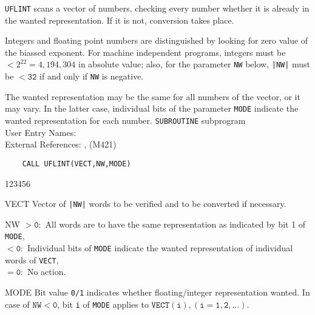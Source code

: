                      
                      
\Submitter{}                          
                    
\begin{center}
\end{center}
{\tt UFLINT} scans a vector of numbers, checking every
number whether it is already in the wanted representation. If it is not,
conversion takes place.
\par
Integers and floating point numbers are distinguished by looking for
zero value of the biassed exponent. For machine independent
programs, integers must be $< 2^{22} = 4,194,304$ in absolute value;
also, for the parameter {\tt NW} below, {\tt |NW|} must be $\mathtt{< 32}$
if and only if {\tt NW} is negative.
\par
The wanted representation may be the same for all numbers of
the vector, or it may vary. In the latter case, individual bits of the
parameter {\tt MODE} indicate the wanted representation for each number.
\Structure
{\tt SUBROUTINE} subprogram \\
User Entry Names:  \\
External References: ,  (M421)
\Usage
\begin{verbatim}
    CALL UFLINT(VECT,NW,MODE)
\end{verbatim}
\begin{DLtt}{123456}
\item [VECT] Vector of {\tt |NW|} words to be verified and to be
converted if necessary.
\item [NW] $\mathtt{> 0:}$ All words are to have the same representation as
indicated by bit 1 of {\tt MODE}, \\
$\mathtt{< 0:}$ Individual bits of {\tt MODE} indicate the wanted
representation of individual words of {\tt VECT},  \\
$\mathtt{= 0:}$ No action.
\item [MODE] Bit value {\tt 0/1} indicates whether floating/integer
representation wanted. In case of $\mathtt{NW < 0}$, bit {\tt i} of
{\tt MODE} applies to $\mathtt{VECT(i), (i=1,2,\ldots)}$.
\end{DLtt}
